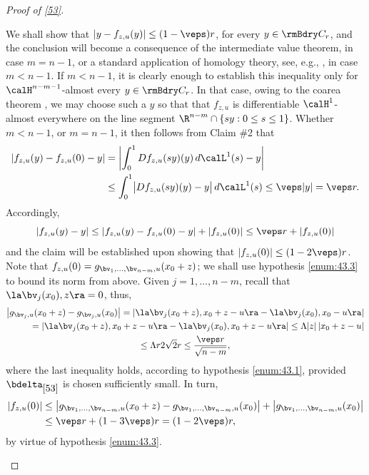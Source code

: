 \begin{proof}[Proof of \ref{53}]
\begin{Empty*}
We shall show that $|y - f_{z,u}(y)| \leq (1-\veps)r$, for every $y \in \rmBdry C_r$, and the conclusion will become a consequence of the intermediate value theorem, in case $m=n-1$, or a standard application of homology theory, see, e.g., \cite[4.6.1]{DEP.05c}, in case $m < n-1$.
If $m < n-1$, it is clearly enough to establish this inequality only for $\calH^{n-m-1}$-almost every $y \in \rmBdry C_r$.
In that case, owing to the coarea theorem \cite[3.2.22]{GMT}, we may choose such a $y$ so that that $f_{z,u}$ is differentiable $\calH^1$-almost everywhere on the line segment $\R^{n-m} \cap \{ sy: 0 \leq s \leq 1 \}$.
Whether $m < n-1$, or $m=n-1$, it then follows from Claim \#2 that
\begin{align*}
\left| f_{z,u}(y) - f_{z,u}(0) - y \right| &= \left| \int_0^1 Df_{z,u}(sy)(y) \,d\calL^1(s) - y \right| \\
&\leq \int_0^1 \bigl| Df_{z,u}(sy)(y)-y\bigr| \,d\calL^1(s) \leq \veps |y| = \veps r.
\end{align*}
Accordingly,
\begin{equation*}
\left|f_{z,u}(y) - y \right| \leq \left| f_{z,u}(y) - f_{z,u}(0) - y \right| + \left| f_{z,u}(0)\right| \leq \veps r + \left| f_{z,u}(0)\right|
\end{equation*}
and the claim will be established upon showing that $\left| f_{z,u}(0)\right| \leq (1- 2 \veps)r$.
Note that $f_{z,u}(0) = g_{\bv_1,\ldots,\bv_{n-m},u}(x_0+z)$; we shall use hypothesis \eqref{enum:43.3} to bound its norm from above.
Given $j=1,\ldots,n-m$, recall that $\la \bv_j(x_0), z \ra = 0$, thus,
\begin{multline*}
\left| g_{\bv_j,u}(x_0+z) - g_{\bv_j,u}(x_0) \right| = \left| \la \bv_j(x_0+z), x_0+z-u \ra - \la \bv_j(x_0), x_0 - u \ra \right| \\
\hspace*{1cm}= \left| \la \bv_j(x_0+z), x_0+z-u \ra - \la \bv_j(x_0), x_0 + z - u \ra \right| \leq \Lambda |z|\, |x_0 + z - u| \\
\leq \Lambda r 2\sqrt{2} r \leq \frac{\veps r}{\sqrt{n-m}},
\end{multline*}
where the last inequality holds, according to hypothesis \eqref{enum:43.1}, provided $\bdelta_{\ref{53}}$ is chosen sufficiently small.
In turn,
\begin{align*}
\left| f_{z,u}(0) \right| &\leq \left| g_{\bv_1,\ldots,\bv_{n-m},u}(x_0+z) - g_{\bv_1,\ldots,\bv_{n-m},u}(x_0) \right| + \left| g_{\bv_1,\ldots,\bv_{n-m},u}(x_0)\right| \\
&\leq \veps r + (1-3\veps)r = (1-2\veps) r,
\end{align*}
by virtue of hypothesis \eqref{enum:43.3}.
\end{Empty*}


\end{proof}

